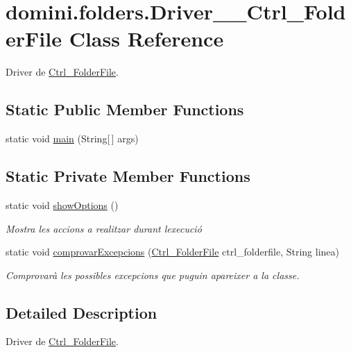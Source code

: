 \hypertarget{classdomini_1_1folders_1_1Driver____Ctrl__FolderFile}{}\section{domini.\+folders.\+Driver\+\_\+\+\_\+\+Ctrl\+\_\+\+Folder\+File Class Reference}
\label{classdomini_1_1folders_1_1Driver____Ctrl__FolderFile}


Driver de \hyperlink{classdomini_1_1folders_1_1Ctrl__FolderFile}{Ctrl\+\_\+\+Folder\+File}.  


\subsection*{Static Public Member Functions}
\begin{DoxyCompactItemize}
\item 
static void \hyperlink{classdomini_1_1folders_1_1Driver____Ctrl__FolderFile_abc98f0085a68ed640e01816cd9a389ef}{main} (String\mbox{[}$\,$\mbox{]} args)
\end{DoxyCompactItemize}
\subsection*{Static Private Member Functions}
\begin{DoxyCompactItemize}
\item 
static void \hyperlink{classdomini_1_1folders_1_1Driver____Ctrl__FolderFile_a5343134690950988d119d5e124edb1b4}{show\+Options} ()
\begin{DoxyCompactList}\small\item\em Mostra les accions a realitzar durant l\textquotesingle{}execució \end{DoxyCompactList}\item 
static void \hyperlink{classdomini_1_1folders_1_1Driver____Ctrl__FolderFile_add85c568af9cc21b5b4dc8c413b8d565}{comprovar\+Excepcions} (\hyperlink{classdomini_1_1folders_1_1Ctrl__FolderFile}{Ctrl\+\_\+\+Folder\+File} ctrl\+\_\+folderfile, String linea)
\begin{DoxyCompactList}\small\item\em Comprovarà les possibles excepcions que puguin apareixer a la classe. \end{DoxyCompactList}\end{DoxyCompactItemize}


\subsection{Detailed Description}
Driver de \hyperlink{classdomini_1_1folders_1_1Ctrl__FolderFile}{Ctrl\+\_\+\+Folder\+File}. 

